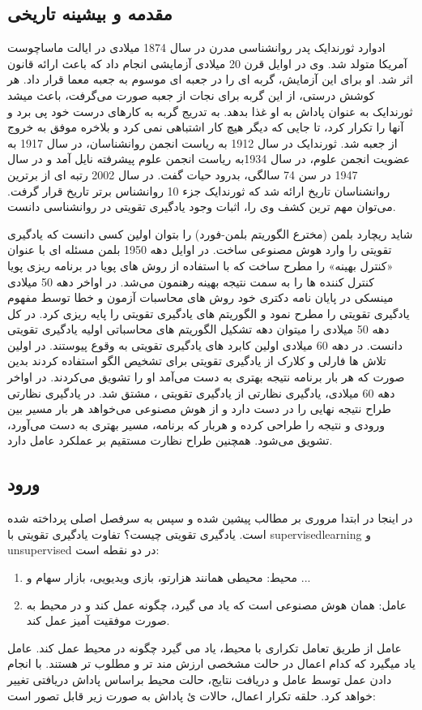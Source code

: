  \subsection{مقدمه و بیشینه تاریخی}
 ادوارد ثورندایک پدر روانشناسی مدرن در سال 1874 میلادی در ایالت ماساچوست آمریکا متولد شد. وی در اوایل قرن 20 میلادی آزمایشی انجام داد که باعث ارائه قانون اثر شد. او برای این آزمایش، گربه ای را در جعبه ای موسوم به جعبه معما قرار داد. هر کوشش درستی، از این گربه برای نجات از جعبه صورت می‌گرفت، باعث میشد ثورندایک به عنوان پاداش به او غذا بدهد. به تدریج گربه به کارهای درست خود پی برد و آنها را تکرار کرد، تا جایی که دیگر هیچ کار اشتباهی نمی کرد و بلاخره موفق به خروج از جعبه شد. ثورندایک در سال 1912 به ریاست انجمن روانشناسان، در سال 1917 به عضویت انجمن علوم، در سال 1934به ریاست انجمن علوم پیشرفته نایل آمد و در سال 1947 در سن 74 سالگی، بدرود حیات گفت. در سال 2002 رتبه ای از برترین روانشناسان تاریخ ارائه شد که ثورندایک جزء 10 روانشناس برتر تاریخ قرار گرفت. می‌توان مهم ترین کشف وی را، اثبات وجود یادگیری تقویتی در روانشناسی دانست.
 
 شاید ریچارد بلمن (مخترع الگوریتم بلمن-فورد) را بتوان اولین کسی دانست که یادگیری تقویتی را وارد هوش مصنوعی ساخت. در اوایل دهه 1950 بلمن مسئله ای با عنوان «کنترل بهینه» را مطرح ساخت که با استفاده از روش های پویا در برنامه ریزی پویا کنترل کننده ها را به سمت نتیجه بهینه رهنمون می‌شد. در اواخر دهه 50 میلادی مینسکی در پایان نامه دکتری خود روش های محاسبات آزمون و خطا توسط مفهوم یادگیری تقویتی را مطرح نمود و الگوریتم های یادگیری تقویتی را پایه ریزی کرد. در کل دهه 50 میلادی را میتوان دهه تشکیل الگوریتم های محاسباتی اولیه یادگیری تقویتی دانست. در دهه 60 میلادی اولین کابرد های یادگیری تقویتی به وقوع پیوستند. در اولین تلاش ها فارلی و کلارک از یادگیری تقویتی برای تشخیص الگو استفاده کردند بدین صورت که هر بار برنامه نتیجه بهتری به دست می‌آمد او را تشویق می‌کردند. در اواخر دهه 60 میلادی، یادگیری نظارتی از یادگیری تقویتی ، مشتق شد. در یادگیری نظارتی طراح نتیجه نهایی را در دست دارد و از هوش مصنوعی می‌خواهد هر بار مسیر بین ورودی و نتیجه را طراحی کرده و هربار که برنامه، مسیر بهتری به دست می‌آورد، تشویق می‌شود. همچنین طراح نظارت مستقیم بر عملکرد عامل دارد.



 \subsection{ورود}
 در اینجا در ابتدا مروری بر مطالب پیشین شده و سپس به سرفصل اصلی پرداخته شده است.
 یادگیری تقویتی چیست؟
 تفاوت یادگیری تقویتی با \gls{supervisedlearning} و \gls{unsupervised} در دو نقطه است:
 \begin{enumerate}
 	\item محیط: محیطی همانند هزارتو، بازی ویدیویی، بازار سهام و ...
 	\item عامل: همان هوش مصنوعی است که یاد می گیرد، چگونه عمل کند و در محیط به صورت موفقیت آمیز عمل کند.
 \end{enumerate}
 عامل از طریق تعامل تکراری با محیط، یاد می گیرد چگونه در محیط عمل کند. عامل یاد میگیرد که کدام اعمال در حالت مشخصی ارزش مند تر و مطلوب تر هستند. با انجام دادن عمل توسط عامل و دریافت نتایج، حالت محیط براساس پاداش دریافتی تغییر خواهد کرد. حلقه تکرار اعمال، حالات ئ پاداش به صورت زیر قابل تصور است:
 
